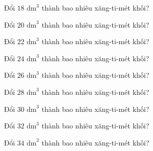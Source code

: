 \begin{ex}
  Đổi $18\text{ dm}^3$ thành bao nhiêu xăng-ti-mét khối?
\end{ex}

\begin{ex}
  Đổi $20\text{ dm}^3$ thành bao nhiêu xăng-ti-mét khối?
\end{ex}

\begin{ex}
  Đổi $22\text{ dm}^3$ thành bao nhiêu xăng-ti-mét khối?
\end{ex}

\begin{ex}
  Đổi $24\text{ dm}^3$ thành bao nhiêu xăng-ti-mét khối?
\end{ex}

\begin{ex}
  Đổi $26\text{ dm}^3$ thành bao nhiêu xăng-ti-mét khối?
\end{ex}

\begin{ex}
  Đổi $28\text{ dm}^3$ thành bao nhiêu xăng-ti-mét khối?
\end{ex}

\begin{ex}
  Đổi $30\text{ dm}^3$ thành bao nhiêu xăng-ti-mét khối?
\end{ex}

\begin{ex}
  Đổi $32\text{ dm}^3$ thành bao nhiêu xăng-ti-mét khối?
\end{ex}

\begin{ex}
  Đổi $34\text{ dm}^3$ thành bao nhiêu xăng-ti-mét khối?
\end{ex}

